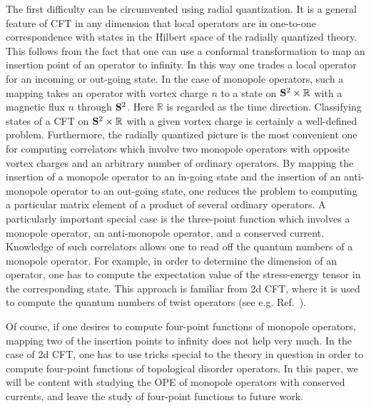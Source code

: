 \documentclass[a4paper,12pt, amsfonts, amssymb]{article}
\newcommand{\RR}{{\mathbb R}}
\begin{document}
The first difficulty can be circumvented using radial quantization. 
It is a general feature of CFT in any dimension that local operators
are in one-to-one correspondence with states in the Hilbert space of
the radially quantized theory. This follows from the fact that one
can use a conformal transformation to map an insertion point of an
operator to infinity. In this way one trades a local operator for
an incoming or out-going state. In the case of monopole operators,
such a mapping takes an operator with vortex charge $n$ to a state on 
${\bf S}^2\times \RR$ with a magnetic flux $n$ through ${\bf S}^2$.
Here $\RR$ is regarded as the time direction.
Classifying states of a CFT on ${\bf S}^2\times \RR$ with a given
vortex charge is certainly a well-defined problem. Furthermore,
the radially quantized picture is the most convenient one for
computing correlators which involve two monopole operators with
opposite vortex charges and an arbitrary number of ordinary operators. 
By mapping the insertion of
a monopole operator to an in-going state and the insertion of an anti-monopole
operator to an out-going state, one reduces the problem
to computing a particular matrix element of a product of several ordinary
operators. A particularly important
special case is the three-point function which
involves a monopole operator, an anti-monopole operator, and a 
conserved current. Knowledge of such correlators allows one
to read off the quantum numbers of a monopole operator. For example,
in order to determine the dimension of an operator, one has to
compute the expectation value of the stress-energy tensor in the
corresponding state. This approach is familiar from 2d CFT,
where it is used to compute the quantum numbers of twist 
operators (see e.g. Ref.~\cite{Ginsparg}). 

Of course, if one desires to compute four-point functions of monopole
operators, mapping two of the insertion points to infinity does not help 
very much. In the case of 2d CFT, one has to use tricks special to the theory in question in order to compute four-point functions of topological 
disorder operators. In this paper, we will be content with studying the OPE of monopole operators with conserved currents, and leave the study of four-point 
functions to future work.
\end{document}
